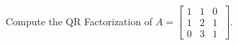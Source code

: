 
\begin{example}
\label{ex:QRFactorization} Compute the QR Factorization of $A=	\left[ \begin{array}{ccc} 1 & 1 & 0 \
\\ 1 & 2 & 1\\
0 & 3 & 1\end{array} \right].$
\end{example}

